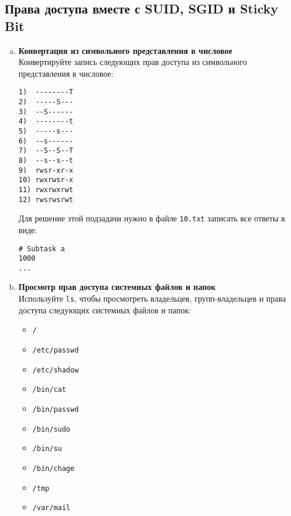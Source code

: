 \documentclass{article}
\begin{document}
\subsection{Права доступа вместе с SUID, SGID и Sticky Bit}

\begin{enumerate}[a.]
\item \textbf{Конвертация из символьного представления в числовое}\\
Конвертируйте запись следующих прав доступа из символьного представления в числовое:
\begin{lstlisting}
1)  --------T
2)  -----S---
3)  --S------
4)  --------t
5)  -----s---
6)  --s------
7)  --S--S--T
8)  --s--s--t
9)  rwsr-xr-x
10) rwxrwsr-x
11) rwxrwxrwt
12) rwsrwsrwt
\end{lstlisting}
Для решение этой подзадачи нужно в файле \texttt{10.txt} записать все ответы в виде:
\begin{lstlisting}
# Subtask a
1000
...
\end{lstlisting}

\item \textbf{Просмотр прав доступа системных файлов и папок}\\
Используйте \texttt{ls}, чтобы просмотреть владельцев, групп-владельцев и права доступа следующих системных файлов и папок:
\begin{itemize}
\item \texttt{/}
\item \texttt{/etc/passwd}
\item \texttt{/etc/shadow}
\item \texttt{/bin/cat}
\item \texttt{/bin/passwd}
\item \texttt{/bin/sudo}
\item \texttt{/bin/su}
\item \texttt{/bin/chage}
\item \texttt{/tmp}
\item \texttt{/var/mail}
\end{itemize}
\end{enumerate}


\iffalse
\newpage
~
\newpage
\end{document}
